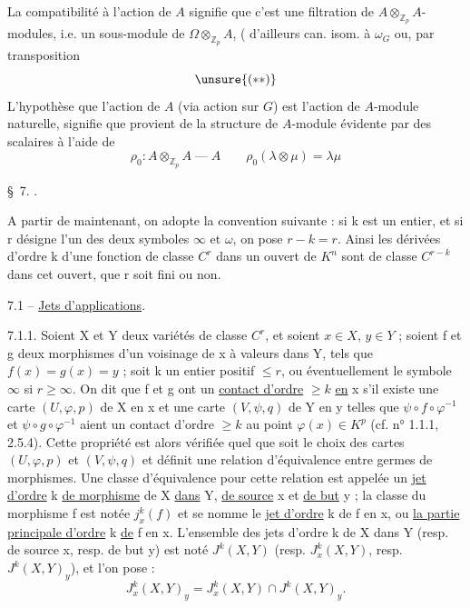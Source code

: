 La compatibilité à l'action de $A$ signifie que c'est une filtration de $A\otimes_{\mathbb Z_p}A$-modules, i.e. un sous-module   de $\Omega\otimes_{\mathbb Z_p}A$, (  d'ailleurs can. isom. à $\omega_G$
ou, par transposition
\[
\unsure{(**)}
\]
L'hypothèse que l'action de $A$  (via action sur $G$) est l'action de $A$-module naturelle, signifie que    provient de la structure de $A$-module  évidente par  des scalaires à l'aide de
\[
\rho_0:A\otimes_{\mathbb Z_p}A\mathrel{\text{---}}A\qquad\rho_0(\lambda\otimes\mu)=\lambda\mu
\]

\S\ 7. .

A partir de maintenant, on adopte la convention suivante : si k est un entier, et si r désigne l'un des deux symboles $\infty$ et $\omega$, on pose $r-k=r$. Ainsi les dérivées d'ordre k d'une fonction de classe $C^r$ dans un ouvert de $K^n$ sont de classe $C^{r-k}$ dans cet ouvert, que r soit fini ou non.

7.1 -- \uline{Jets d'applications}.

7.1.1. Soient X et Y deux variétés de classe $C^r$, et soient $x\in X$, $y\in Y$ ; soient f et g deux morphismes d'un voisinage de x à valeurs dans Y, tels que $f(x)=g(x)=y$ ; soit k un entier positif $\leq r$, ou éventuellement le symbole $\infty$ si $r\geq\infty$. On dit que f et g ont un \uline{contact d'ordre} $\geq k$ \uline{en} x s'il existe une carte $(U,\varphi,p)$ de X en x et une carte $(V,\psi,q)$ de Y en y telles que $\psi\circ f\circ\varphi^{-1}$ et $\psi\circ g\circ\varphi^{-1}$ aient un contact d'ordre $\geq k$ au point $\varphi(x)\in K^p$ (cf. n° 1.1.1, 2.5.4). Cette propriété est alors vérifiée quel que soit le choix des cartes $(U,\varphi,p)$ et $(V,\psi,q)$ et définit une relation d'équivalence entre germes de morphismes. Une classe d'équivalence pour cette relation est appelée un \uline{jet d'ordre} k \uline{de morphisme} de X \uline{dans} Y, \uline{de source} x et \uline{de but} y ; la classe du morphisme f est notée $j_x^k(f)$ et se nomme le \uline{jet d'ordre} k de f en x, ou \uline{la partie principale d'ordre} k \uline{de} f en x. L'ensemble des jets d'ordre k de X dans Y (resp. de source x, resp. de but y) est noté $J^k(X,Y)$ (resp. $J_x^k(X,Y)$, resp. $J^k(X,Y)_y$), et l'on pose :
\[
J_x^k(X,Y)_y=J_x^k(X,Y)\cap J^k(X,Y)_y.
\]

